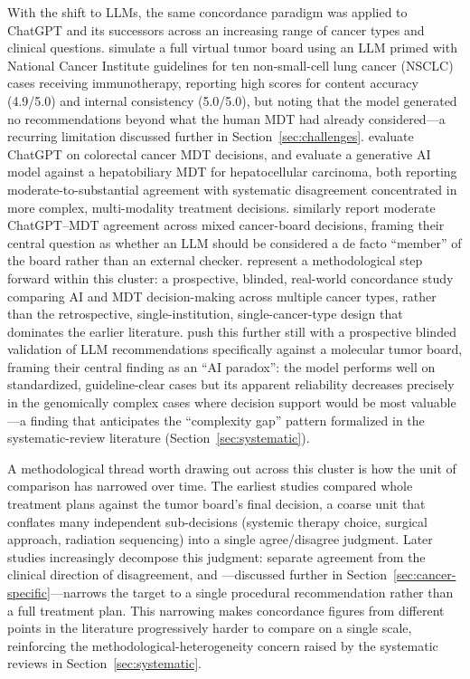 \documentclass[acmsmall,screen=true,review=false,nonacm=true]{acmart}
\begin{document}
With the shift to LLMs, the same concordance paradigm was applied to ChatGPT and its successors across an increasing range of cancer types and clinical questions. \citet{ismayilov2025} simulate a full virtual tumor board using an LLM primed with National Cancer Institute guidelines for ten non-small-cell lung cancer (NSCLC) cases receiving immunotherapy, reporting high scores for content accuracy (4.9/5.0) and internal consistency (5.0/5.0), but noting that the model generated no recommendations beyond what the human MDT had already considered---a recurring limitation discussed further in Section~\ref{sec:challenges}. \citet{chatziisaak2025} evaluate ChatGPT on colorectal cancer MDT decisions, and \citet{ciulli2026} evaluate a generative AI model against a hepatobiliary MDT for hepatocellular carcinoma, both reporting moderate-to-substantial agreement with systematic disagreement concentrated in more complex, multi-modality treatment decisions. \citet{dogan2025} similarly report moderate ChatGPT--MDT agreement across mixed cancer-board decisions, framing their central question as whether an LLM should be considered a de facto ``member'' of the board rather than an external checker. \citet{pinninti2026} represent a methodological step forward within this cluster: a prospective, blinded, real-world concordance study comparing AI and MDT decision-making across multiple cancer types, rather than the retrospective, single-institution, single-cancer-type design that dominates the earlier literature. \citet{seshachalam2026} push this further still with a prospective blinded validation of LLM recommendations specifically against a molecular tumor board, framing their central finding as an ``AI paradox'': the model performs well on standardized, guideline-clear cases but its apparent reliability decreases precisely in the genomically complex cases where decision support would be most valuable---a finding that anticipates the ``complexity gap'' pattern formalized in the systematic-review literature (Section~\ref{sec:systematic}).

A methodological thread worth drawing out across this cluster is how the unit of comparison has narrowed over time. The earliest studies \citep{somashekhar2018} compared whole treatment plans against the tumor board's final decision, a coarse unit that conflates many independent sub-decisions (systemic therapy choice, surgical approach, radiation sequencing) into a single agree/disagree judgment. Later studies increasingly decompose this judgment: \citet{aliyev2026} separate agreement from the clinical direction of disagreement, and \citet{aubreville2024}---discussed further in Section~\ref{sec:cancer-specific}---narrows the target to a single procedural recommendation rather than a full treatment plan. This narrowing makes concordance figures from different points in the literature progressively harder to compare on a single scale, reinforcing the methodological-heterogeneity concern raised by the systematic reviews in Section~\ref{sec:systematic}.
\end{document}
